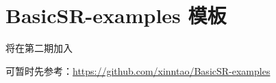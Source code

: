 \documentclass[../main.tex]{subfiles}
\begin{document}
\chapter{BasicSR-examples 模板}\label{chapter:template}
\vspace{-2cm}

将在第二期加入

可暂时先参考：\url{https://github.com/xinntao/BasicSR-examples}
\end{document}
